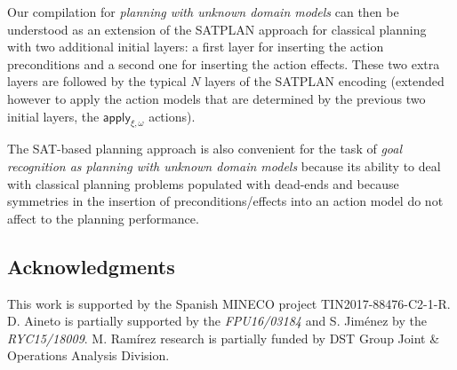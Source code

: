 \documentclass[letterpaper]{article} %
\begin{document}
Our compilation for {\em planning with unknown domain models} can then be understood as an extension of the SATPLAN approach for classical planning~\cite{kautz1992planning} with two additional initial layers: a first layer for inserting the action preconditions and a second one for inserting the action effects. These two extra layers are followed by the typical $N$ layers of the SATPLAN encoding (extended however to apply the action models that are determined by the previous two initial layers, the $\mathsf{apply_{\xi,\omega}}$ actions). 

The SAT-based planning approach is also convenient for the task of {\em goal recognition as planning with unknown domain models} because its ability to deal with classical planning problems populated with dead-ends and because symmetries in the insertion of preconditions/effects into an action model do not affect to the planning performance.


\subsection*{Acknowledgments}
This work is supported by the Spanish MINECO project TIN2017-88476-C2-1-R. D. Aineto is partially supported by the {\it FPU16/03184} and S. Jim\'enez by the {\it RYC15/18009}. M. Ram\'irez research is partially funded by DST Group Joint \& Operations Analysis Division.



\end{document}
